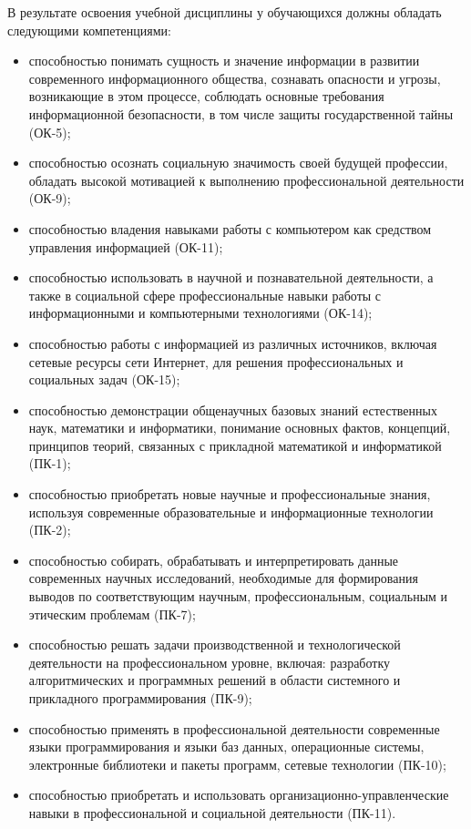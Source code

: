 \documentclass[a4paper]{article}
\begin{document}
В результате освоения учебной дисциплины у обучающихся должны обладать следующими компетенциями:
\begin{itemize}
  \item способностью понимать сущность и значение информации в развитии современного информационного общества, сознавать опасности и угрозы, возникающие в этом процессе, соблюдать основные требования информационной безопасности, в том числе защиты государственной тайны (ОК-5);
  \item способностью осознать социальную значимость своей будущей профессии, обладать высокой мотивацией к выполнению профессиональной деятельности (ОК-9);
  \item способностью владения навыками работы с компьютером как средством управления информацией (ОК-11);
  \item способностью использовать в научной и познавательной деятельности, а также в социальной сфере профессиональные навыки работы с информационными и компьютерными технологиями (ОК-14);
  \item способностью работы с информацией из различных источников, включая сетевые ресурсы сети Интернет, для решения профессиональных и социальных задач (ОК-15);
  \item способностью демонстрации общенаучных базовых знаний естественных наук, математики и информатики, понимание основных фактов, концепций, принципов теорий, связанных с прикладной математикой и информатикой (ПК-1);
  \item способностью приобретать новые научные и профессиональные знания, используя современные образовательные и информационные технологии (ПК-2);
  \item способностью собирать, обрабатывать и интерпретировать данные современных научных исследований, необходимые для формирования выводов по соответствующим научным, профессиональным, социальным и этическим проблемам (ПК-7);
  \item способностью решать задачи производственной и технологической деятельности на профессиональном уровне, включая: разработку алгоритмических и программных решений в области системного и прикладного программирования (ПК-9);
  \item способностью применять в профессиональной деятельности современные языки программирования и языки баз данных, операционные системы, электронные библиотеки и пакеты программ, сетевые технологии (ПК-10);
  \item способностью приобретать и использовать организационно-управленческие навыки в профессиональной и социальной деятельности (ПК-11).
\end{itemize}
\end{document}
